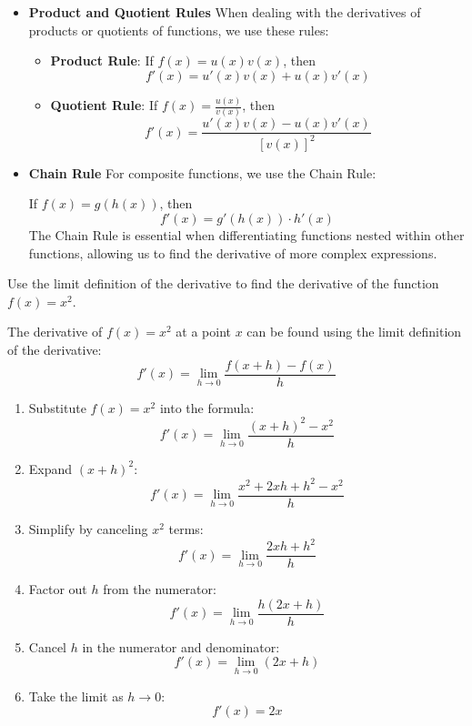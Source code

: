 \begin{itemize}
\item \textbf{Product and Quotient Rules}
When dealing with the derivatives of products or quotients of functions, we use these rules:

\begin{itemize}
\item \textbf{Product Rule}: If \( f(x) = u(x)v(x) \), then
\[
f'(x) = u'(x)v(x) + u(x)v'(x)
\]
\item \textbf{Quotient Rule}: If \( f(x) = \frac{u(x)}{v(x)} \), then
\[
f'(x) = \frac{u'(x)v(x) - u(x)v'(x)}{[v(x)]^2}
\]
\end{itemize}

\item \textbf{Chain Rule}
For composite functions, we use the Chain Rule:

If \( f(x) = g(h(x)) \), then
\[
f'(x) = g'(h(x)) \cdot h'(x)
\]
The Chain Rule is essential when differentiating functions nested within other functions, allowing us to find the derivative of more complex expressions.

\end{itemize}

\exampleline
\begin{example}
Use the limit definition of the derivative to find the derivative of the function \( f(x) = x^2 \).

\begin{solution}
The derivative of \( f(x) = x^2 \) at a point \( x \) can be found using the limit definition of the derivative:
\[
f'(x) = \lim_{h \to 0} \frac{f(x+h) - f(x)}{h}
\]
\begin{enumerate}
    \item Substitute \( f(x) = x^2 \) into the formula:
    \[
    f'(x) = \lim_{h \to 0} \frac{(x+h)^2 - x^2}{h}
    \]
    \item Expand \( (x+h)^2 \):
    \[
    f'(x) = \lim_{h \to 0} \frac{x^2 + 2xh + h^2 - x^2}{h}
    \]
    \item Simplify by canceling \( x^2 \) terms:
    \[
    f'(x) = \lim_{h \to 0} \frac{2xh + h^2}{h}
    \]
    \item Factor out \( h \) from the numerator:
    \[
    f'(x) = \lim_{h \to 0} \frac{h(2x + h)}{h}
    \]
    \item Cancel \( h \) in the numerator and denominator:
    \[
    f'(x) = \lim_{h \to 0} (2x + h)
    \]
    \item Take the limit as \( h \to 0 \):
    \[
    f'(x) = 2x
    \]
\end{enumerate}
\end{solution}
\end{example}


